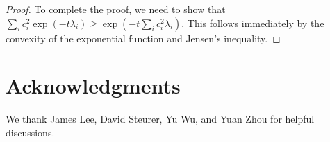 \documentclass[11pt]{article}
\begin{document}
\begin{proof}
To complete the proof, we need to show that $\sum_i c_i^2 \exp(-t \lambda_i) \geq \exp(-t \sum_i c_i^2 \lambda_i)$.  This follows immediately by the convexity of the exponential function and Jensen's inequality.
\end{proof}


\section*{Acknowledgments}
We thank James Lee, David Steurer, Yu Wu, and Yuan Zhou for helpful discussions.




\end{document}
